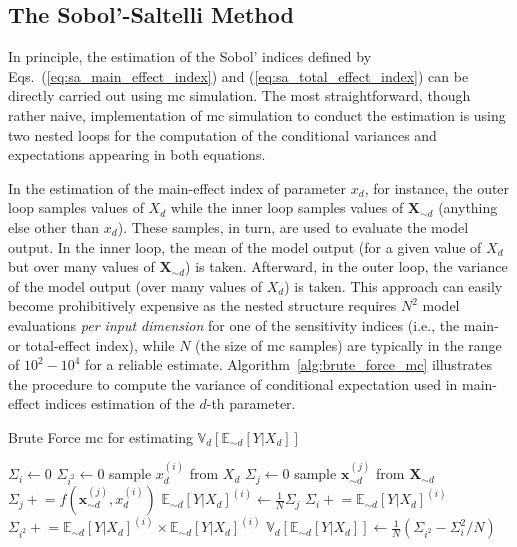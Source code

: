 \subsection{The Sobol'-Saltelli Method}\label{sub:sa_sobol_saltelli}

In principle, the estimation of the Sobol' indices defined by Eqs.~(\ref{eq:sa_main_effect_index}) and (\ref{eq:sa_total_effect_index}) can be directly carried out using \gls{mc} simulation.
The most straightforward, though rather naive, 
implementation of \gls{mc} simulation to conduct the estimation is using two nested loops for the computation of the conditional variances and expectations appearing in both equations.

In the estimation of the main-effect index of parameter $x_d$, for instance, 
the outer loop samples values of $X_d$ while the inner loop samples values of $\mathbf{X}_{\sim d}$ (anything else other than $x_d$).
These samples, in turn, are used to evaluate the model output.
In the inner loop, the mean of the model output (for a given value of $X_d$ but over many values of $\mathbf{X}_{\sim d}$) is taken. 
Afterward, in the outer loop, the variance of the model output (over many values of $X_d$) is taken.
This approach can easily become prohibitively expensive as the nested structure requires $N^2$ model evaluations \emph{per input dimension} for one of the sensitivity indices (i.e., the main- or total-effect index), 
while $N$ (the size of \gls{mc} samples) are typically in the range of $10^2 - 10^4$ for a reliable estimate. 
Algorithm~\ref{alg:brute_force_mc} illustrates the procedure to compute the variance of conditional expectation used in main-effect indices estimation of the $d$-th parameter.

\begin{algorithm}
\caption{Brute Force \gls{mc} for estimating $\mathbb{V}_d [\mathbb{E}_{\sim d} [Y|X_d]]$}
\label{alg:brute_force_mc}
\begin{algorithmic}
\STATE $\Sigma_i \leftarrow 0$
\STATE $\Sigma_{i^2} \leftarrow 0$
    \STATE sample $x_d^{(i)}$ from $X_d$
    \STATE $\Sigma_j \leftarrow 0$
      \STATE sample $\mathbf{x}_{\sim d}^{(j)}$ from $\mathbf{X}_{\sim d}$
      \STATE $\Sigma_j \mathrel{+}= f(\mathbf{x}_{\sim d}^{(j)}, x_d^{(i)})$ 
    \ENDFOR
    \STATE $\mathbb{E}_{\sim d} [Y|X_d]^{(i)} \leftarrow \frac{1}{N} \Sigma_j$
    \STATE $\Sigma_i \mathrel{+}= \mathbb{E}_{\sim d} [Y|X_d]^{(i)}$
    \STATE $\Sigma_{i^2} \mathrel{+}= \mathbb{E}_{\sim d} [Y|X_d]^{(i)} \times \mathbb{E}_{\sim d} [Y|X_d]^{(i)}$
  \ENDFOR
  \STATE $\mathbb{V}_d [\mathbb{E}_{\sim d} [Y|X_d]] \leftarrow \frac{1}{N} \left(\Sigma_{i^2} - \Sigma_i^2/N\right)$
\end{algorithmic}
\end{algorithm}

